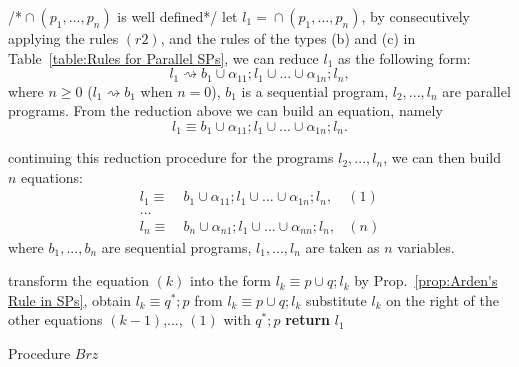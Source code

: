 \documentclass{fcs}
\DeclareMathOperator{\seq}{;}
\DeclareMathOperator{\para}{\cap}
\newcommand{\red}[0]{\rightsquigarrow}
\newcommand{\ToSeq}[0]{\mathit{Brz}}
\begin{document}
    \begin{algorithm}[ptb]
    \begin{algorithmic}[1]
    \Procedure{Brz}{$\para(p_1,...,p_n)$} /*$\para(p_1,...,p_n)$ is well defined*/
    \State let $l_1 = \para(p_1,...,p_n)$, by consecutively applying the rules $(r2)$, and the rules of the types (b) and (c) in Table~\ref{table:Rules for Parallel SPs},
    we can reduce $l_1$ as the following form:
\begin{equation}
\label{equ:ToSeq}
    l_1\red b_1\cup \alpha_{11}\seq l_1\cup ...\cup \alpha_{1n}\seq l_n,
\end{equation}
    where $n\ge 0$ ($l_1\red b_1$ when $n = 0$), $b_1$ is a sequential program, $l_2,...,l_n$ are parallel programs.
    From the reduction above we can build an equation, namely
    $$
    l_1\equiv b_1\cup \alpha_{11}\seq l_1\cup ...\cup \alpha_{1n}\seq l_n.
    $$

    \State
    continuing this reduction procedure for the programs $l_2,..., l_n$, we can then build $n$ equations:
    $$
    \begin{aligned}
    l_1\equiv&\ b_1\cup \alpha_{11}\seq l_1\cup ...\cup \alpha_{1n}\seq l_n, &(1)\\
    ...\\
    l_n\equiv&\ b_n\cup \alpha_{n1}\seq l_1\cup...\cup \alpha_{nn}\seq l_n, &(n)
    \end{aligned}
    $$
    where $b_1,...,b_n$ are sequential programs, $l_1,...,l_n$ are taken as $n$ variables.

        \State transform the equation $(k)$ into the form $l_k\equiv p\cup q\seq l_k$
        \State by Prop.~\ref{prop:Arden's Rule in SPs}, obtain $l_k\equiv q^*\seq p$ from $l_k\equiv p\cup q\seq l_k$
        \State substitute $l_k$ on the right of the other equations $(k-1)$,..., $(1)$ with $q^*\seq p$
    \EndFor
    \State \textbf{return} $l_1$
    \EndProcedure
    \end{algorithmic}
    \captionsetup{font=footnotesize}
    \caption{\footnotesize{Procedure $\ToSeq$}}
    \label{alg:ToSeq}
    \end{algorithm}
\end{document}
